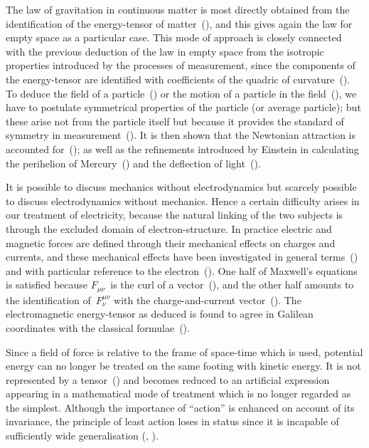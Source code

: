\documentclass[12pt]{book}
\begin{document}
The law of gravitation in continuous matter is most directly obtained from
the identification of the energy\hyp{}tensor of matter~(), and this gives again the
law for empty space as a particular case. This mode of approach is closely
connected with the previous deduction of the law in empty space from the
isotropic properties introduced by the processes of measurement, since the
components of the energy\hyp{}tensor are identified with coefficients of the quadric
of curvature~(). To deduce the field of a particle~() or the motion of a
particle in the field~(), we have to postulate symmetrical properties of the
particle (or average particle); but these arise not from the particle itself but
because it provides the standard of symmetry in measurement~(). It is then
shown that the Newtonian attraction is accounted for~(); as well as the
refinements introduced by Einstein in calculating the perihelion of Mercury~()
and the deflection of light~().

It is possible to discuss mechanics without electrodynamics but scarcely
possible to discuss electrodynamics without mechanics. Hence a certain difficulty
arises in our treatment of electricity, because the natural linking of the
two subjects is through the excluded domain of electron\hyp{}structure. In practice
electric and magnetic forces are defined through their mechanical effects on
charges and currents, and these mechanical effects have been investigated in
general terms~() and with particular reference to the electron~(). One
half of Maxwell's equations is satisfied because $F_{\mu\nu}$~is the curl of a vector~(),
and the other half amounts to the identification of~$F_{\nu}^{\mu\nu}$ with the charge\hyp{}and\hyp{}current
vector~(). The electromagnetic energy\hyp{}tensor as deduced is found
to agree in Galilean coordinates with the classical formulae~().

Since a field of force is relative to the frame of space-time which is used,
potential energy can no longer be treated on the same footing with kinetic
energy. It is not represented by a tensor~() and becomes reduced to an
artificial expression appearing in a mathematical mode of treatment which is
no longer regarded as the simplest. Although the importance of ``action'' is
enhanced on account of its invariance, the principle of least action loses in
status since it is incapable of sufficiently wide generalisation (, ).
\end{document}
